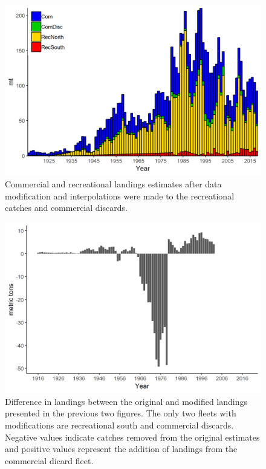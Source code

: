 \documentclass[12pt,]{article}
\begin{document}
\begin{figure}
\centering
\includegraphics{Figures/Catches_alternate.png}
\caption{Commercial and recreational landings estimates after data
modification and interpolations were made to the recreational catches
and commercial discards. \label{fig:Catches_alternate}}
\end{figure}

\begin{figure}
\centering
\includegraphics{Figures/catches_difference.png}
\caption{Difference in landings between the original and modified
landings presented in the previous two figures. The only two fleets with
modifications are recreational south and commercial discards. Negative
values indicate catches removed from the original estimates and positive
values represent the addition of landings from the commercial dicard
fleet. \label{fig:catches_difference}}
\end{figure}
\end{document}

